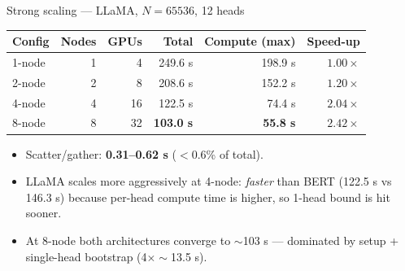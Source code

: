 \documentclass[aspectratio=169]{beamer}
\begin{document}
\begin{frame}{Strong scaling — LLaMA, $N{=}65536$, 12 heads}
  \begin{center}
  \begin{tabular}{@{}lrrrrr@{}}
    \toprule
    \textbf{Config} & \textbf{Nodes} & \textbf{GPUs} &
      \textbf{Total} & \textbf{Compute (max)} & \textbf{Speed-up} \\
    \midrule
    1-node & 1 & 4  & 249.6 s & 198.9 s & $1.00\times$ \\
    2-node & 2 & 8  & 208.6 s & 152.2 s & $1.20\times$ \\
    4-node & 4 & 16 & 122.5 s &  74.4 s & $2.04\times$ \\
    8-node & 8 & 32 & \textbf{103.0 s} & \textbf{55.8 s} & $\mathbf{2.42\times}$ \\
    \bottomrule
  \end{tabular}
  \end{center}
  \vspace{0.4em}
  \begin{itemize}\small
    \item Scatter/gather: \textbf{0.31--0.62 s} ($<0.6$\% of total).
    \item LLaMA scales more aggressively at 4-node: \emph{faster} than BERT
          (122.5 s vs 146.3 s) because per-head compute time is higher,
          so 1-head bound is hit sooner.
    \item At 8-node both architectures converge to $\sim$103 s —
          dominated by setup + single-head bootstrap (4$\times\sim$13.5 s).
  \end{itemize}
\end{frame}
\end{document}
